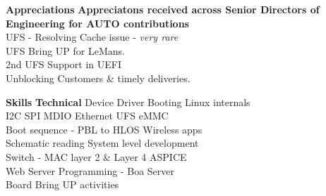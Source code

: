 \textbf{Appreciations}
\footnotesize{
   \textbf{Appreciatons received across Senior Directors of Engineering for AUTO contributions} \\
   \textbullet UFS - Resolving Cache issue - \emph{very rare} \\
   \textbullet UFS \textendash{} Bring UP for LeMans. \\
   \textbullet 2nd UFS Support in UEFI \\
   \textbullet Unblocking Customers \& timely deliveries.
}


\textbf{Skills}
\textbf{Technical}{ }          %
   \textbullet Device Driver \textbullet Booting \textbullet Linux internals \\
   \textbullet I2C \textbullet SPI \textbullet MDIO \textbullet Ethernet \textbullet UFS \textbullet eMMC \\ 
   \textbullet Boot sequence - PBL to HLOS \textbullet Wireless apps\\
   \textbullet Schematic reading \textbullet System level development \\
   \textbullet Switch - MAC layer 2 \& Layer 4 \textbullet ASPICE \\
   \textbullet Web Server Programming - Boa Server \\
   \textbullet Board Bring UP activities \\

